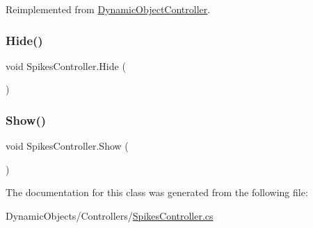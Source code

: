 Reimplemented from \mbox{\hyperlink{class_dynamic_object_controller_ac82dd85f0560a3ba17e50cc1254fbca3}{Dynamic\+Object\+Controller}}.

\mbox{\label{class_spikes_controller_a94bdba9f7e3ac69a290d3107df82818d}} 
\subsubsection{\texorpdfstring{Hide()}{Hide()}}
{\footnotesize\ttfamily void Spikes\+Controller.\+Hide (\begin{DoxyParamCaption}{ }\end{DoxyParamCaption})}

\mbox{\label{class_spikes_controller_a24419970bc1bf77a5b70f12fd502a98b}} 
\subsubsection{\texorpdfstring{Show()}{Show()}}
{\footnotesize\ttfamily void Spikes\+Controller.\+Show (\begin{DoxyParamCaption}{ }\end{DoxyParamCaption})}



The documentation for this class was generated from the following file\+:\begin{DoxyCompactItemize}
\item 
Dynamic\+Objects/\+Controllers/\mbox{\hyperlink{_spikes_controller_8cs}{Spikes\+Controller.\+cs}}\end{DoxyCompactItemize}
